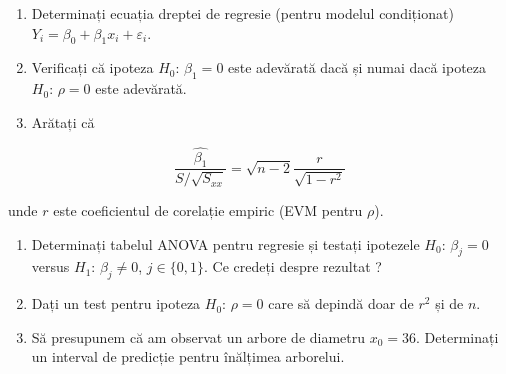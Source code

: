 \documentclass[]{article}
\begin{document}
\begin{enumerate}
\def\labelenumi{\alph{enumi})}
\item
  Determinați ecuația dreptei de regresie (pentru modelul condiționat)
  \(Y_i = \beta_0 + \beta_1 x_i + \varepsilon_i\).
\item
  Verificați că ipoteza \(H_0:\, \beta_1=0\) este adevărată dacă și
  numai dacă ipoteza \(H_0:\, \rho=0\) este adevărată.
\item
  Arătați că
\end{enumerate}

\[
    \frac{\hat{\beta_1}}{S/\sqrt{S_{xx}}}=\sqrt{n-2}\frac{r}{\sqrt{1-r^2}}
  \]

unde \(r\) este coeficientul de corelație empiric (EVM pentru \(\rho\)).

\begin{enumerate}
\def\labelenumi{\alph{enumi})}
\setcounter{enumi}{3}
\item
  Determinați tabelul ANOVA pentru regresie și testați ipotezele
  \(H_0:\, \beta_j=0\) versus \(H_1:\,\beta_j\neq0\), \(j\in\{0,1\}\).
  Ce credeți despre rezultat ?
\item
  Dați un test pentru ipoteza \(H_0:\, \rho = 0\) care să depindă doar
  de \(r^2\) și de \(n\).
\item
  Să presupunem că am observat un arbore de diametru \(x_0=36\).
  Determinați un interval de predicție pentru înălțimea arborelui.
\end{enumerate}
\end{document}
